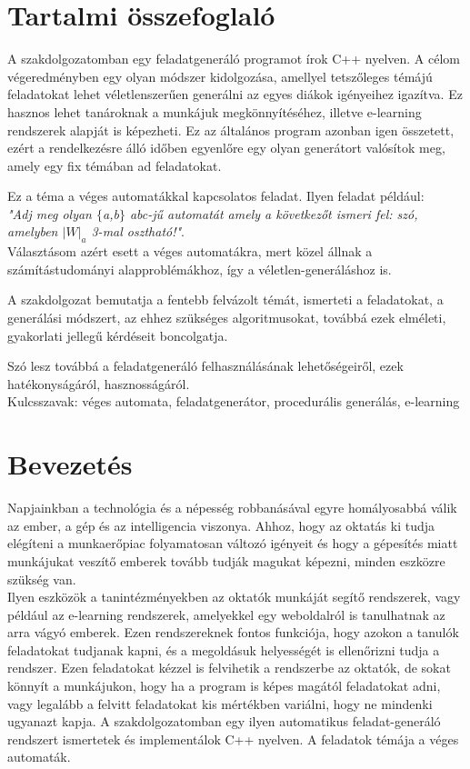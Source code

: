 \documentclass[12pt]{report}
\theoremstyle{definition}
\begin{document}
\chapter*{Tartalmi összefoglaló}

A szakdolgozatomban egy feladatgeneráló programot írok C++ nyelven. A célom végeredményben egy olyan módszer kidolgozása, amellyel tetszőleges témájú feladatokat lehet véletlenszerűen generálni az egyes diákok igényeihez igazítva. Ez hasznos lehet tanároknak a munkájuk megkönnyítéséhez, illetve e-learning rendszerek alapját is képezheti. Ez az általános program azonban igen összetett, ezért a rendelkezésre álló időben egyenlőre egy olyan generátort valósítok meg, amely egy fix témában ad feladatokat.

Ez a téma a véges automatákkal kapcsolatos feladat. Ilyen feladat például:\\

\textit{"Adj meg olyan $\{$a,b$\}$ abc-jű automatát amely a következőt ismeri fel: szó, amelyben $|W|_a$ 3-mal osztható!"}.
\\

Választásom azért esett a véges automatákra, mert közel állnak a számítástudományi alapproblémákhoz, így a véletlen-generáláshoz is.

A szakdolgozat bemutatja a fentebb felvázolt témát, ismerteti a feladatokat, a generálási módszert, az ehhez szükséges algoritmusokat, továbbá ezek elméleti, gyakorlati jellegű kérdéseit boncolgatja.

Szó lesz továbbá a feladatgeneráló felhasználásának lehetőségeiről, ezek hatékonyságáról, hasznosságáról.
\\

Kulcsszavak: véges automata, feladatgenerátor, procedurális generálás, e-learning

\chapter*{Bevezetés}
Napjainkban a technológia és a népesség robbanásával egyre homályosabbá válik az ember, a gép és az intelligencia viszonya. Ahhoz, hogy az oktatás ki tudja elégíteni a munkaerőpiac folyamatosan változó igényeit és hogy a gépesítés miatt munkájukat veszítő emberek tovább tudják magukat képezni, minden eszközre szükség van.\\

Ilyen eszközök a tanintézményekben az oktatók munkáját segítő rendszerek, vagy például az e-learning rendszerek, amelyekkel egy weboldalról is tanulhatnak az arra vágyó emberek.
Ezen rendszereknek fontos funkciója, hogy azokon a tanulók feladatokat tudjanak kapni, és a megoldásuk helyességét is ellenőrizni tudja a rendszer. Ezen feladatokat kézzel is felvihetik a rendszerbe az oktatók, de sokat könnyít a munkájukon, hogy ha a program is képes magától feladatokat adni, vagy legalább a felvitt feladatokat kis mértékben variálni, hogy ne mindenki ugyanazt kapja. A szakdolgozatomban egy ilyen automatikus feladat-generáló rendszert ismertetek és implementálok C++ nyelven. A feladatok témája a véges automaták.
\end{document}
